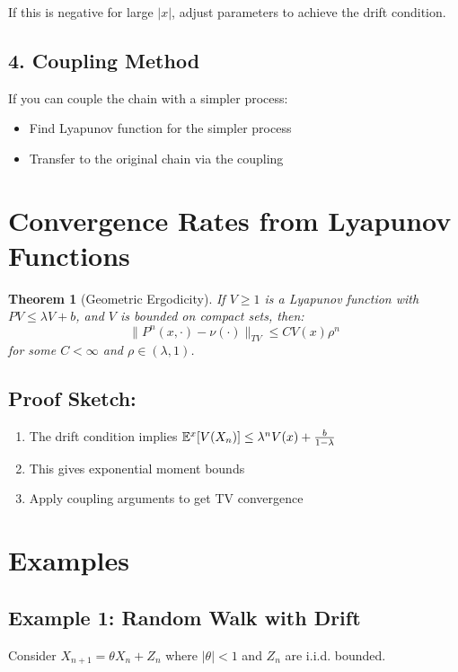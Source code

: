 \documentclass{amsart}
\let\originalmathbb\mathbb
\renewcommand{\mathbb}[1]{%
    \ifstrequal{#1}{1}{\mathbbm{#1}}{\originalmathbb{#1}}%
}
\theoremstyle{plain}
\newtheorem{theorem}{Theorem}[section]
\theoremstyle{definition}
\theoremstyle{remark}
\begin{document}
If this is negative for large $|x|$, adjust parameters to achieve the drift condition.

\subsection{4. Coupling Method}

If you can couple the chain with a simpler process:

\begin{itemize}
	\item Find Lyapunov function for the simpler process
	\item Transfer to the original chain via the coupling
\end{itemize}

\section{Convergence Rates from Lyapunov Functions}

\begin{theorem}[Geometric Ergodicity]
If $V \geq 1$ is a Lyapunov function with $PV \leq \lambda V + b$, and $V$ is bounded on compact sets, then:
\[
\|P^n(x,\cdot) - \nu(\cdot)\|_{TV} \leq C V(x) \rho^n
\]
for some $C < \infty$ and $\rho \in (\lambda, 1)$.
\end{theorem}
\subsection{Proof Sketch:}

\begin{enumerate}
	\item The drift condition implies $\mathbb{E}^x[V(X_n)] \leq \lambda^n V(x) + \frac{b}{1-\lambda}$
	\item This gives exponential moment bounds
	\item Apply coupling arguments to get TV convergence
\end{enumerate}

\section{Examples}

\subsection{Example 1: Random Walk with Drift}

Consider $X_{n+1} = \theta X_n + Z_n$ where $|\theta| < 1$ and $Z_n$ are i.i.d. bounded.
\end{document}
